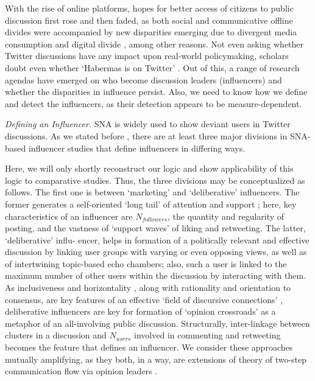 With the rise of online platforms, hopes for better access of citizens to public discussion first rose \cite{Fuchs} and then faded, as both social \cite{Nakamura} and communicative \cite{Daniels} offline divides were accompanied by new disparities emerging due to divergent media consumption \cite{PfetschAdam,BodrunovaLitvinenko} and digital divide \cite{Norris,VanDeursenVanDijk}, among other reasons. Not even asking whether Twitter discussions have any impact upon real-world policymaking, scholars doubt even whether ‘Habermas is on Twitter’ \cite{BrunsHighfeld2016} \cite[p.~31]{Murthy}. Out of this, a range of research agendas have emerged on who become discussion leaders (influencers) and whether the disparities in influence persist. Also, we need to know how we define and detect the influencers, as their detection appears to be measure-dependent.

\textit{Defining an Influencer.} SNA is widely used to show deviant users in Twitter discussions. As we stated before \cite{BodrunovaLitvinenkoBlekanov2016}, there are at least three major divisions in SNA-based influencer studies that define influencers in differing ways.

Here, we will only shortly reconstruct our logic and show applicability of this logic to comparative studies. Thus, the three divisions may be conceptualized as follows. The first one is between ‘marketing’ and ‘deliberative’ influencers. The former generates a self-oriented ‘long tail’ of attention and support \cite[p.~1261]{DuboisGaffney} \cite{Aquino}; here, key characteristics of an influencer are \(N_{followers}\), the quantity and regularity of posting, and the vastness of ‘support waves’ of liking and retweeting. The latter, ‘deliberative’ influ- encer, helps in formation of a politically relevant and effective discussion by linking user groups with varying or even opposing views, as well as of intertwining topic-based echo chambers; also, such a user is linked to the maximum number of other users within the discussion by interacting with them. As inclusiveness and horizontality \cite{Papacharissi2010}, along with rationality and orientation to consensus, are key features of an effective ‘field of discursive connections’ \cite[p.~37]{Calhoun}, deliberative influencers are key for formation of ‘opinion crossroads’ \cite{BodrunovaLitvinenko,VanDeursenVanDijk} as a metaphor of an all-involving public discussion. Structurally, inter-linkage between clusters in a discussion and \(N_{users}\) involved in commenting and retweeting becomes the feature that defines an influencer. We consider these approaches mutually amplifying, as they both, in a way, are extensions of theory of two-step communication flow via opinion leaders \cite{Katz}.

